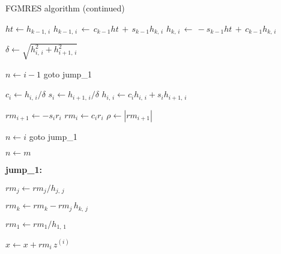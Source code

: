 %
\clearpage

%
\begin{algorithm}
\caption{FGMRES algorithm (continued)}

\begin{algorithmic}

\State 

\State $ht \gets h_{k-1,\,i}$
\State $h_{k-1,\,i}\, \gets \,  c_{k-1} ht \,+\, s_{k-1} h_{k,\,i}$
\State $h_{k,\,i}\,   \gets \, -s_{k-1} ht \,+\, c_{k-1} h_{k,\,i}$
\EndFor

\State
\State $\delta \gets \sqrt{h_{i,\,i}^2 + h_{i+1,\,i}^2}$

\State
\If {($\delta < \epsilon$)}
\State $n \gets i-1$
\State goto jump\_1
\EndIf
\State

\State $c_i \gets h_{i,\,i} / \delta$
\State $s_i \gets h_{i+1,\,i} / \delta$
\State $h_{i,\,i} \gets c_i h_{i,\,i} + s_i h_{i+1,\,i}$
\State

\State $rm_{i+1} \gets -s_i r_i$
\State $rm_{i} \gets c_i r_i$
\State $\rho \gets |rm_{i+1}|$
\State

\State $n \gets i$
\State goto jump\_1
\EndIf

\EndFor

\State
\State $n \gets m$

\State
\State \bf{jump\_1:}
\State


\State $rm_j \gets rm_j / h_{j,\,j}$

\State $rm_k \gets rm_k - rm_j \, h_{k,\,j}$
\EndFor

\EndFor

\State
\State $rm_1 \gets rm_1 / h_{1,\,1}$
\State

\State $x \gets x + rm_i \, z^{(i)}$
\EndFor

\EndFor

\end{algorithmic}

\end{algorithm}















